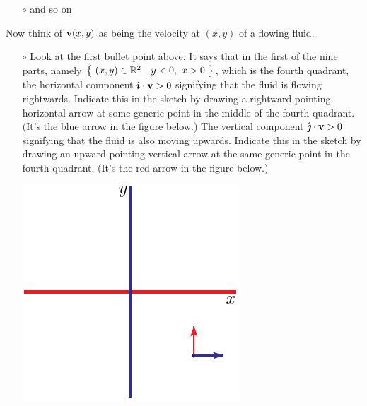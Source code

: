 \begin{eg}
\begin{itemize}
\item[$\circ$] 
and so on
\end{itemize}
Now think of $\mathbf{v}(x,y)$ as being the velocity at $(x,y)$ of a flowing fluid.
\begin{itemize}%
\item[$\circ$]
Look at the first bullet point above. It says that in the first of the nine 
parts, namely $\big\{\ (x,y)\in\bbbr^2\ \big|\  y<0,\ x>0\ \big\}$,
which is the fourth quadrant, 
the horizontal component  $\hat{\pmb{\imath}}\cdot\mathbf{v}>0$ signifying that the fluid is flowing
rightwards. Indicate this in the sketch by drawing a rightward pointing 
horizontal arrow at some generic point in the middle of the fourth quadrant. 
(It's the blue arrow in the figure below.)
The vertical component  $\hat{\pmb{\jmath}}\cdot\mathbf{v}>0$ signifying that the fluid is 
also moving upwards. Indicate this in the sketch by drawing an upward 
pointing vertical arrow at the same generic point in the fourth quadrant.
(It's the red arrow in the figure below.)
\begin{efig}
\begin{center}
    \includegraphics[scale=0.8]{phaseVortex4.pdf}
\end{center}
\end{efig}



\end{itemize}
\end{eg}
